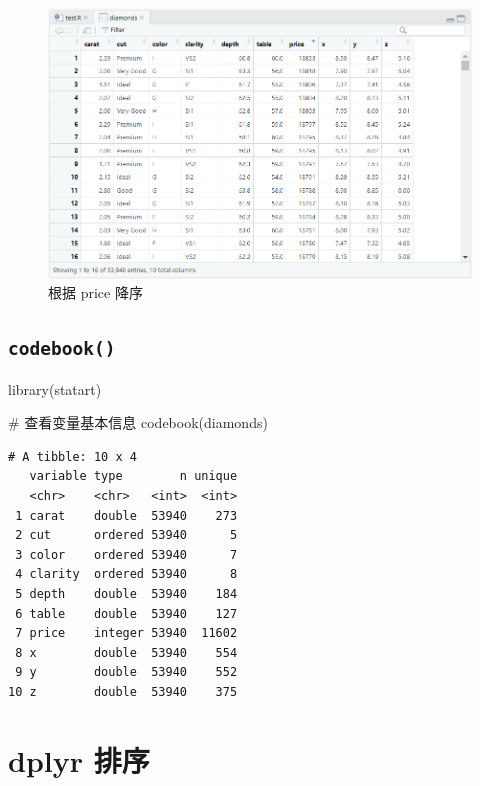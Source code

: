 \documentclass[
  letterpaper,
]{ctexbook}
\newenvironment{Shaded}{\begin{snugshade}}{\end{snugshade}}
\newcommand{\CommentTok}[1]{\textcolor[rgb]{0.37,0.37,0.37}{#1}}
\newcommand{\FunctionTok}[1]{\textcolor[rgb]{0.28,0.35,0.67}{#1}}
\newcommand{\NormalTok}[1]{\textcolor[rgb]{0.00,0.23,0.31}{#1}}
\begin{document}
\begin{figure}

{\centering \includegraphics{fig/view3.png}

}

\caption{\label{fig-view3}根据 price 降序}

\end{figure}

\hypertarget{codebook}{%
\section{\texorpdfstring{\texttt{codebook()}}{codebook()}}\label{codebook}}

\begin{Shaded}
\begin{Highlighting}[]
\FunctionTok{library}\NormalTok{(statart)}

\CommentTok{\# 查看变量基本信息}
\FunctionTok{codebook}\NormalTok{(diamonds)}
\end{Highlighting}
\end{Shaded}

\begin{verbatim}
# A tibble: 10 x 4
   variable type        n unique
   <chr>    <chr>   <int>  <int>
 1 carat    double  53940    273
 2 cut      ordered 53940      5
 3 color    ordered 53940      7
 4 clarity  ordered 53940      8
 5 depth    double  53940    184
 6 table    double  53940    127
 7 price    integer 53940  11602
 8 x        double  53940    554
 9 y        double  53940    552
10 z        double  53940    375
\end{verbatim}

\hypertarget{dplyr-ux6392ux5e8f}{%
\chapter{dplyr 排序}\label{dplyr-ux6392ux5e8f}}
\end{document}
